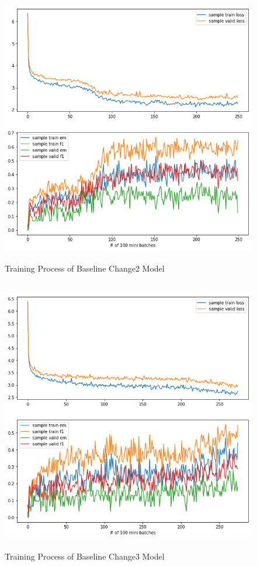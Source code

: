 \documentclass[modernstyle,12pt]{sjsuthesis}
\theoremstyle{definition}
\begin{document}
\begin{figure}[htbp]\centering
  \includegraphics[width=12cm, height=12cm]{figures/match_change2.png}
  \caption{Training Process of Baseline Change2 Model}
  \label{f:baseline_change2}
\end{figure}

\begin{figure}[htbp]\centering
  \includegraphics[width=12cm, height=12cm]{figures/match_change3.png}
  \caption{Training Process of Baseline Change3 Model}
  \label{f:baseline_change3}
\end{figure}
\end{document}

